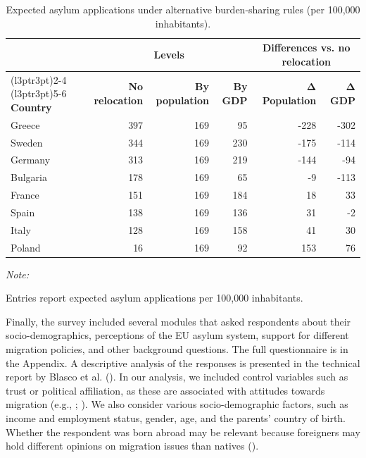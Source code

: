 \documentclass[
  12pt,
  a4paper,
]{article}
\begin{document}
\begin{table}[!h]
\centering
\caption{\label{tab:relocation}Expected asylum applications under alternative burden-sharing rules (per 100,000 inhabitants).}
\centering
\fontsize{10}{12}\selectfont
\begin{threeparttable}
\begin{tabular}[t]{lrrrrr}
\toprule
\multicolumn{1}{c}{\textbf{ }} & \multicolumn{3}{c}{\textbf{Levels}} & \multicolumn{2}{c}{\textbf{Differences vs. no relocation}} \\
\cmidrule(l{3pt}r{3pt}){2-4} \cmidrule(l{3pt}r{3pt}){5-6}
\textbf{Country} & \textbf{No relocation} & \textbf{By population} & \textbf{By GDP} & \textbf{Δ Population} & \textbf{Δ GDP}\\
\midrule
Greece & 397 & 169 & 95 & -228 & -302\\
Sweden & 344 & 169 & 230 & -175 & -114\\
Germany & 313 & 169 & 219 & -144 & -94\\
Bulgaria & 178 & 169 & 65 & -9 & -113\\
France & 151 & 169 & 184 & 18 & 33\\
Spain & 138 & 169 & 136 & 31 & -2\\
Italy & 128 & 169 & 158 & 41 & 30\\
Poland & 16 & 169 & 92 & 153 & 76\\
\bottomrule
\end{tabular}
\begin{tablenotes}
\item \textit{Note:} 
\item Entries report expected asylum applications per 100,000 inhabitants.
\end{tablenotes}
\end{threeparttable}
\end{table}

Finally, the survey included several modules that asked respondents about their socio-demographics, perceptions of the EU asylum system, support for different migration policies, and other background questions. The full questionnaire is in the Appendix. A descriptive analysis of the responses is presented in the technical report by Blasco et al. (). In our analysis, we included control variables such as trust or political affiliation, as these are associated with attitudes towards migration (e.g., ; ). We also consider various socio-demographic factors, such as income and employment status, gender, age, and the parents' country of birth. Whether the respondent was born abroad may be relevant because foreigners may hold different opinions on migration issues than natives ().
\end{document}
